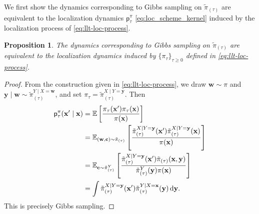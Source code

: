 \documentclass[11pt]{article}
\newtheorem{proposition}{Proposition}
\newcommand{\dd}{\textup{d}}
\newcommand{\0}{\mathbf{0}}
\newcommand{\1}{\mathbf{1}}
\newcommand{\vc}{\mathbf{c}}
\newcommand{\vw}{\mathbf{w}}
\newcommand{\vx}{\mathbf{x}}
\newcommand{\vy}{\mathbf{y}}
\begin{document}
We first show the dynamics corresponding to Gibbs sampling on $\tilde{\pi}_{(\tau)}$ are equivalent to the localization dynamics $\mathsf{p}_\tau^\pi$ \eqref{eq:loc_scheme_kernel} induced by the localization process of \eqref{eq:llt-loc-process}.
\begin{proposition}\label{prop:gibbs_loc}
    The dynamics corresponding to Gibbs sampling on $\tilde{\pi}_{(\tau)}$ are equivalent to the localization dynamics induced by $\{\pi_\tau\}_{\tau\geq 0}$ defined in \eqref{eq:llt-loc-process}.
\end{proposition}
\begin{proof}
    From the construction given in \eqref{eq:llt-loc-process}, we draw $\vw\sim \pi$ and $\vy\mid \vw\sim \tilde{\pi}_{(\tau)}^{Y\mid X=\vw}$, and set $\pi_\tau=\tilde{\pi}_{(\tau)}^{X\mid Y=\vy}$.  Then
    \begin{align*}
        \mathsf{p}_{\tau}^\pi(\vx'\mid \vx) 
        &=\mathbb{E}\left[ \frac{\pi_\tau(\vx')\pi_\tau(\vx)}{\pi(\vx)} \right]\\
        &=\mathbb{E}_{(\vw, \vc)\sim \tilde{\pi}_{(\tau)}}\left[ \frac{\tilde{\pi}_{(\tau)}^{X\mid Y=\vy}(\vx')\tilde{\pi}_{(\tau)}^{X\mid Y=\vy}(\vx)}{\pi(\vx)} \right]\\
        &=\mathbb{E}_{\vc\sim \tilde{\pi}_{(\tau)}^Y}\left[ \frac{\tilde{\pi}_{(\tau)}^{X\mid Y=\vy}(\vx')\tilde{\pi}_{(\tau)}(\vx, \vy)}{\tilde{\pi}_{(\tau)}^Y(\vy)\pi(\vx)} \right]\\
        &=\int \tilde{\pi}_{(\tau)}^{X\mid Y=\vy}(\vx') \tilde{\pi}_{(\tau)}^{Y\mid X=\vx}(\vy)\,\dd\vy.
    \end{align*}
    This is precisely Gibbs sampling.
\end{proof}
\end{document}
